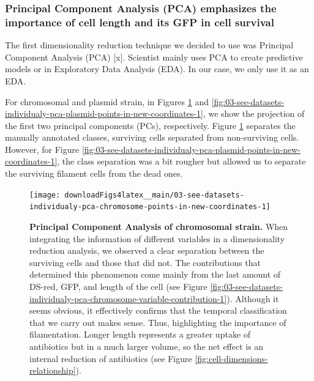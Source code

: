 \documentclass[a4paper, nobind]{templates/ociamthesis}
\begin{document}
\hypertarget{principal-component-analysis-pca-emphasizes-the-importance-of-cell-length-and-its-gfp-in-cell-survival}{%
\subsubsection{Principal Component Analysis (PCA) emphasizes the importance of cell length and its GFP in cell survival}\label{principal-component-analysis-pca-emphasizes-the-importance-of-cell-length-and-its-gfp-in-cell-survival}}

The first dimensionality reduction technique we decided to use was Principal Component Analysis (PCA) {[}x{]}.
Scientist mainly uses PCA to create predictive models or in Exploratory Data Analysis (EDA).
In our case, we only use it as an EDA.

For chromosomal and plasmid strain, in Figures \ref{fig:03-see-datasets-individualy-pca-chromosome-points-in-new-coordinates-1} and \ref{fig:03-see-datasets-individualy-pca-plasmid-points-in-new-coordinates-1}, we show the projection of the first two principal components (PCs), respectively.
Figure \ref{fig:03-see-datasets-individualy-pca-chromosome-points-in-new-coordinates-1} separates the manually annotated classes, surviving cells separated from non-surviving cells.
However, for Figure \ref{fig:03-see-datasets-individualy-pca-plasmid-points-in-new-coordinates-1}, the class separation was a bit rougher but allowed us to separate the surviving filament cells from the dead ones.





\begin{figure}[H]
\texttt{[image: downloadFigs4latex\_\_main/03-see-datasets-individualy-pca-chromosome-points-in-new-coordinates-1]} \caption[Principal Component Analysis of chromosomal strain.]{\textbf{Principal Component Analysis of chromosomal strain.} When integrating the information of different variables in a dimensionality reduction analysis, we observed a clear separation between the surviving cells and those that did not. The contributions that determined this phenomenon come mainly from the last amount of DS-red, GFP, and length of the cell (see Figure \ref{fig:03-see-datasets-individualy-pca-chromosome-variable-contribution-1}). Although it seems obvious, it effectively confirms that the temporal classification that we carry out makes sense. Thus, highlighting the importance of filamentation. Longer length represents a greater uptake of antibiotics but in a much larger volume, so the net effect is an internal reduction of antibiotics (see Figure \ref{fig:cell-dimensions-relationship}).}\label{fig:03-see-datasets-individualy-pca-chromosome-points-in-new-coordinates-1}
\end{figure}
\end{document}
